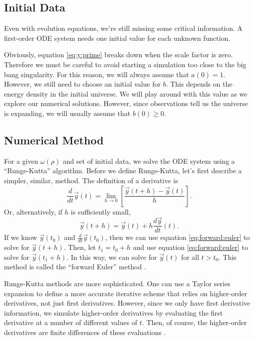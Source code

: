\documentclass[]{article}
\newcommand{\myvec}[1]{\vec{#1}} %
\newcommand{\diff}[2]{\frac{d #1}{d #2}}
\newcommand{\dd}[1]{\frac{d}{d #1}}
\newcommand{\ddt}{\dd{t}}
\newcommand{\dt}[1]{\diff{#1}{t}}
\begin{document}
\subsection{Initial Data}
\label{subsec:initial:data}

Even with evolution equations, we're still missing some critical
information. A first-order ODE system needs one initial value for each
unknown function.

Obviously, equation \eqref{eq:y:prime} breaks down when the scale
factor is zero. Therefore we must be careful to avoid starting a
simulation too close to the big bang singularity. For this reason, we
will always assume that $a(0) = 1$. However, we still need to choose
an initial value for $b$. This depends on the energy density in the
initial universe. We will play around with this value as we explore
our numerical solutions. However, since observations tell us the
universe is expanding, we will usually assume that $b(0) \geq 0$.

\subsection{Numerical Method}
\label{subsec:numerical:method}

For a given $\omega(\rho)$ and set of initial data, we solve the ODE
system using a ``Runge-Kutta'' algorithm. Before we define
Runge-Kutta, let's first describe a simpler, similar, method. The
definition of a derivative is
\begin{equation}
  \label{eq:derivative:definition}
  \ddt\myvec{y}(t) = \lim_{h\to 0}\left[\frac{\myvec{y}(t+h) - \myvec{y}(t)}{h}\right].
\end{equation}
Or, alternatively, if $h$ is sufficiently small,
\begin{equation}
  \label{eq:forward:euler}
  \myvec{y}(t+h) = \myvec{y}(t) + h \dt{\myvec{y}}(t).
\end{equation}
If we know $\myvec{y}(t_0)$ and $\ddt\myvec{y}(t_0)$, then we can use
equation \eqref{eq:forward:euler} to solve for $\myvec{y}(t+h)$. Then,
let $t_1 = t_0 + h$ and use equation \eqref{eq:forward:euler} to solve
for $\myvec{y}(t_1 + h)$. In this way, we can solve for $\myvec{y}(t)$
for all $t > t_0$. This method is called the ``forward Euler'' method
\cite{Heath}.

Runge-Kutta methods are more sophisticated. One can use a Taylor
series expansion to define a more accurate iterative scheme that
relies on higher-order derivatives, not just first
derivatives. However, since we only have first derivative information,
we simulate higher-order derivatives by evaluating the first
derivative at a number of different values of $t$. Then, of course,
the higher-order derivatives are finite differences of these
evaluations \cite{NumericalRecipes,Heath}.
\end{document}
